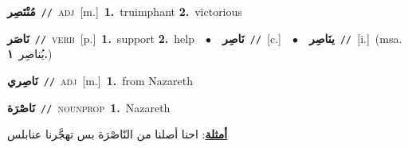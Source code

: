 \documentclass[10pt,a4paper,twoside]{article} %
\begin{document}
\begin{multicols}{2}
{\setlength\topsep{0pt}\textbf{\foreignlanguage{arabic}{مُنْتَصِر}}\ {\color{gray}\texttt{//}\color{black}}\ \textsc{adj}\ [m.]\ \textbf{1.}~truimphant  \textbf{2.}~victorious\ } \vspace{2mm}

{\setlength\topsep{0pt}\textbf{\foreignlanguage{arabic}{نَاصَر}}\ {\color{gray}\texttt{//}\color{black}}\ \textsc{verb}\ [p.]\ \textbf{1.}~support  \textbf{2.}~help\ \ $\bullet$\ \ \setlength\topsep{0pt}\textbf{\foreignlanguage{arabic}{نَاصِر}}\ {\color{gray}\texttt{//}\color{black}}\ [c.]\ \ $\bullet$\ \ \setlength\topsep{0pt}\textbf{\foreignlanguage{arabic}{ينَاصِر}}\ {\color{gray}\texttt{//}\color{black}}\ [i.]\ \color{gray}(msa. \foreignlanguage{arabic}{يُناصِر}~\foreignlanguage{arabic}{\textbf{١.}})\color{black}\ } \vspace{2mm}

{\setlength\topsep{0pt}\textbf{\foreignlanguage{arabic}{نَاصِري}}\ {\color{gray}\texttt{//}\color{black}}\ \textsc{adj}\ [m.]\ \textbf{1.}~from Nazareth\ } \vspace{2mm}

{\setlength\topsep{0pt}\textbf{\foreignlanguage{arabic}{نَاصْرَة}}\ {\color{gray}\texttt{//}\color{black}}\ \textsc{noun\textunderscore prop}\ \textbf{1.}~Nazareth\  \begin{flushright}\color{gray}\foreignlanguage{arabic}{\textbf{\underline{\foreignlanguage{arabic}{أمثلة}}}: احنا أصلنا من النّاصْرَة بس تهجَّرنا عنابلس}\end{flushright}\color{black}} \vspace{2mm}


\end{multicols}
\end{document}
